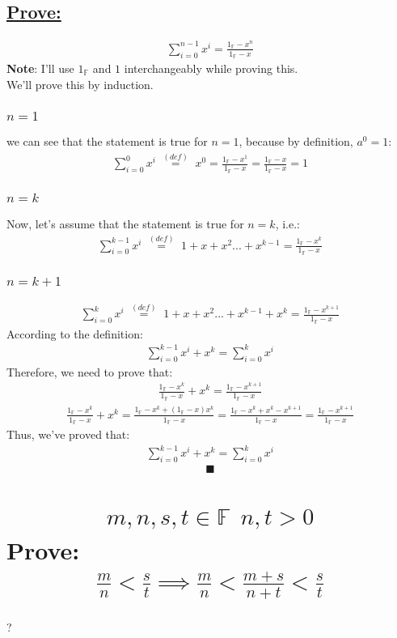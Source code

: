 \documentclass[a4paper, 12pt]{article}
\newcommand{\sub}[1]{\subsection{\underline{#1}}}
\newcommand{\subsub}[1]{\subsubsection{\underline{#1}}}
\newcommand{\?}{\stackrel{?}{=}}
\newcommand{\F}{\ensuremath{\mathbb{F}}}
\newcommand{\Onef}{\ensuremath{1_{\F}}}
\newcommand{\eqbcuz}[1]{\text{~$\stackrel{(#1)}{=}$~}}
\newcommand{\eq}[1]{\begin{align*}#1\end{align*}}
\renewcommand{\qed}{$$\blacksquare$$}
\renewcommand{\b}[1]{\textbf{#1}}
\begin{document}
\sub{Prove:}
\eq{\sum^{n-1}_{i=0}x^{i}=\frac{\Onef-x^n}{\Onef-x}}
\b{Note}: I'll use $\Onef$ and $1$ interchangeably while proving this.\\
We'll prove this by induction.
\subsub{$n=1$}
we can see that the statement is true for $n=1$, because by definition, $a^0=1$:
\eq{\sum^{0}_{i=0}x^{i}\eqbcuz{def}x^0=\frac{\Onef-x^1}{\Onef-x}=\frac{\Onef-x}{\Onef-x}=1}
\subsub{$n=k$}
Now, let's assume that the statement is true for $n=k$, i.e.:
\eq{\sum^{k-1}_{i=0}x^{i}\eqbcuz{def}1+x+x^2...+x^{k-1}=\frac{\Onef-x^k}{\Onef-x}}
\subsub{$n=k+1$}
\eq{\sum^{k}_{i=0}x^{i}\eqbcuz{def}1+x+x^2...+x^{k-1}+x^k=\frac{\Onef-x^{k+1}}{\Onef-x}}
According to the definition:
\eq{ \sum^{k-1}_{i=0}x^{i} + x^k = \sum^{k}_{i=0}x^{i} }
Therefore, we need to prove that:
\eq{ \frac{\Onef-x^k}{\Onef-x} + x^k = \frac{\Onef-x^{k+1}}{\Onef-x} }
\eq{
    \frac{\Onef-x^k}{\Onef-x} + x^k =
    \frac{\Onef-x^k+(\Onef-x)x^k}{\Onef-x} =
    \frac{\Onef-x^k+x^k-x^{k+1}} {\Onef-x} =
    \frac{\Onef-x^{k+1}} {\Onef-x}
}
Thus, we've proved that:
\eq{ \sum^{k-1}_{i=0}x^{i} + x^k = \sum^{k}_{i=0}x^{i} }
\qed

\section{\eq{ m,n,s,t\in{\F}~~n,t>0}Prove: \eq{\frac{m}{n}<\frac{s}{t}\implies \frac{m}{n}<\frac{m+s}{n+t}<\frac{s}{t} }}
?\pagebreak

\setcounter{section}{7}
\end{document}
